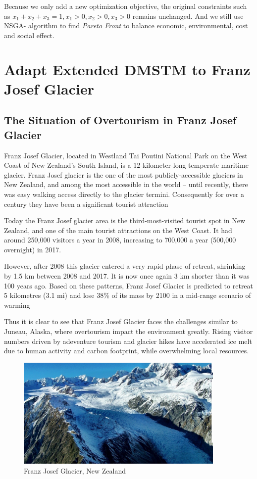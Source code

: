 \documentclass{mcmthesis}
\begin{document}
Because we only add a new optimization objective, the original constraints such as $x_1+x_2+x_3=1, x_1>0,x_2>0,x_3>0$ 
remains unchanged. And we still use NSGA-\uppercase\expandafter{} algorithm to find
\emph{Pareto Front} to balance economic, environmental, cost and social effect.

\section{Adapt Extended DMSTM to Franz Josef Glacier}
\subsection{The Situation of Overtourism in Franz Josef Glacier}
Franz Josef Glacier, located in Westland Tai Poutini National Park on the West Coast of New Zealand's South Island, 
is a 12-kilometer-long temperate maritime glacier. Franz Josef glacier is the one of the most publicly-accessible glaciers in New Zealand,
and among the most accessible in the world -- until recently, there was easy walking access directly to the glacier termini. 
Consequently for over a century they have been a significant tourist attraction\cite{wilson2013west}

Today the Franz Josef glacier area is the third-most-visited tourist spot in New Zealand, 
and one of the main tourist attractions on the West Coast. It had around 250,000 visitors a year in 2008, 
increasing to 700,000 a year (500,000 overnight) in 2017.

However, after 2008 this glacier entered a very rapid phase of retreat, shrinking by 1.5 km between 2008 and 2017.
It is now once again 3 km shorter than it was 100 years ago. Based on these patterns, 
Franz Josef Glacier is predicted to retreat 5 kilometres (3.1 mi) and lose 38\% of its mass by 2100 in a mid-range scenario of warming\cite{anderson2008response}

Thus it is clear to see that Franz Josef Glacier faces the challenges similar to Juneau, Alaska, where overtourism 
impact the environment greatly. Rising visitor numbers driven by adeventure tourism and glacier hikes have accelerated ice melt
due to human activity and carbon footprint, while overwhelming local resources.

\begin{figure}[H]
  \centering
  \includegraphics[width=0.9\textwidth]{figures/glaicer2.png}
  \caption{Franz Josef Glacier, New Zealand}
  \label{Fig.3}
\end{figure}
\end{document}
